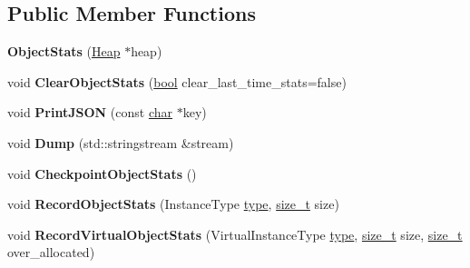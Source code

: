 \subsection*{Public Member Functions}
\begin{DoxyCompactItemize}
\item 
\mbox{\label{classv8_1_1internal_1_1ObjectStats_a78adee874f8f1284f4caa2ac11aefb60}} 
{\bfseries Object\+Stats} (\mbox{\hyperlink{classv8_1_1internal_1_1Heap}{Heap}} $\ast$heap)
\item 
\mbox{\label{classv8_1_1internal_1_1ObjectStats_ab745f971849d58bd37b0a0d956e5564e}} 
void {\bfseries Clear\+Object\+Stats} (\mbox{\hyperlink{classbool}{bool}} clear\+\_\+last\+\_\+time\+\_\+stats=false)
\item 
\mbox{\label{classv8_1_1internal_1_1ObjectStats_a3974c7f19a91772161542fe0466ecaca}} 
void {\bfseries Print\+J\+S\+ON} (const \mbox{\hyperlink{classchar}{char}} $\ast$key)
\item 
\mbox{\label{classv8_1_1internal_1_1ObjectStats_a5a31a1d5a9c88c1a26071ab8b65d47c1}} 
void {\bfseries Dump} (std\+::stringstream \&stream)
\item 
\mbox{\label{classv8_1_1internal_1_1ObjectStats_a14203f3ab5defd5efc18d334430cdc66}} 
void {\bfseries Checkpoint\+Object\+Stats} ()
\item 
\mbox{\label{classv8_1_1internal_1_1ObjectStats_a230437ed3e9bf4a15dc6c42f96386f33}} 
void {\bfseries Record\+Object\+Stats} (Instance\+Type \mbox{\hyperlink{classstd_1_1conditional_1_1type}{type}}, \mbox{\hyperlink{classsize__t}{size\+\_\+t}} size)
\item 
\mbox{\label{classv8_1_1internal_1_1ObjectStats_a254f99b96e017b8e3f394cdee70bd9e9}} 
void {\bfseries Record\+Virtual\+Object\+Stats} (Virtual\+Instance\+Type \mbox{\hyperlink{classstd_1_1conditional_1_1type}{type}}, \mbox{\hyperlink{classsize__t}{size\+\_\+t}} size, \mbox{\hyperlink{classsize__t}{size\+\_\+t}} over\+\_\+allocated)
\item 

\end{DoxyCompactItemize}
